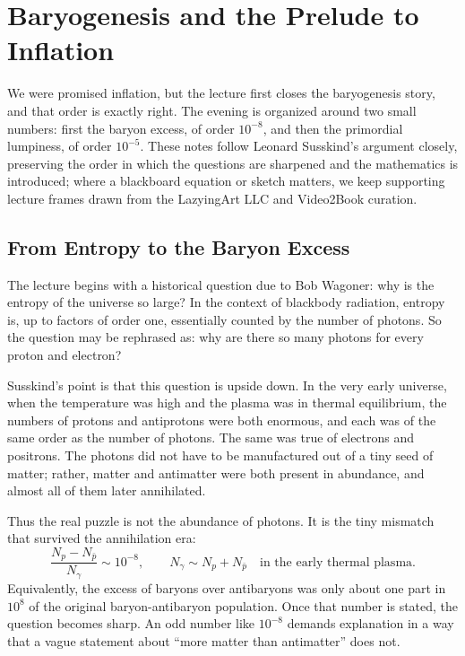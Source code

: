 \chapter{Baryogenesis and the Prelude to Inflation}

We were promised inflation, but the lecture first closes the baryogenesis story, and that order is exactly right. The evening is organized around two small numbers: first the baryon excess, of order \(10^{-8}\), and then the primordial lumpiness, of order \(10^{-5}\). These notes follow Leonard Susskind's argument closely, preserving the order in which the questions are sharpened and the mathematics is introduced; where a blackboard equation or sketch matters, we keep supporting lecture frames drawn from the LazyingArt LLC and Video2Book curation.

\section{From Entropy to the Baryon Excess}

The lecture begins with a historical question due to Bob Wagoner: why is the entropy of the universe so large? In the context of blackbody radiation, entropy is, up to factors of order one, essentially counted by the number of photons. So the question may be rephrased as: why are there so many photons for every proton and electron?

Susskind's point is that this question is upside down. In the very early universe, when the temperature was high and the plasma was in thermal equilibrium, the numbers of protons and antiprotons were both enormous, and each was of the same order as the number of photons. The same was true of electrons and positrons. The photons did not have to be manufactured out of a tiny seed of matter; rather, matter and antimatter were both present in abundance, and almost all of them later annihilated.

Thus the real puzzle is not the abundance of photons. It is the tiny mismatch that survived the annihilation era:
\begin{equation}
\frac{N_p-N_{\bar p}}{N_\gamma}\sim 10^{-8},
\qquad
N_\gamma \sim N_p+N_{\bar p}
\quad
\text{in the early thermal plasma.}
\end{equation}
Equivalently, the excess of baryons over antibaryons was only about one part in \(10^8\) of the original baryon-antibaryon population. Once that number is stated, the question becomes sharp. An odd number like \(10^{-8}\) demands explanation in a way that a vague statement about ``more matter than antimatter'' does not.

